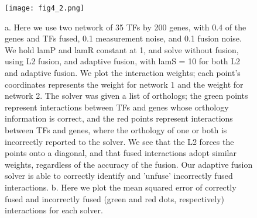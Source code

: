 \documentclass[11pt]{article}
\begin{document}
\begin{figure}
\begin{center}
  \texttt{[image: fig4\_2.png]}
  \caption{\label{adaptivefusion} a.  Here we use two network of 35 TFs by 200 genes, with 0.4 of the genes and TFs fused, 0.1 measurement noise, and 0.1 fusion noise. We hold lamP and lamR constant at 1, and solve without fusion, using L2 fusion, and adaptive fusion, with lamS = 10 for both L2 and adaptive fusion. We plot the interaction weights; each point's coordinates represents the weight for network 1 and the weight for network 2. The solver was given a list of orthologs; the green points represent interactions between TFs and genes whose orthology information is correct, and the red points represent interactions between TFs and genes, where the orthology of one or both is incorrectly reported to the solver. We see that the L2 forces the points onto a diagonal, and that fused interactions adopt similar weights, regardless of the accuracy of the fusion. Our adaptive fusion solver is able to correctly identify and 'unfuse' incorrectly fused interactions. b. Here we plot the mean squared error of correctly fused and incorrectly fused (green and red dots, respectively) interactions for each solver.}
\end{center}
\end{figure}
\end{document}

